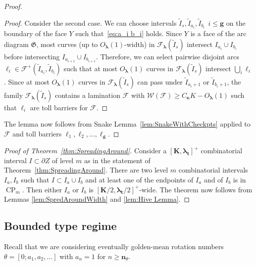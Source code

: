 \documentclass{amsart}
\renewcommand{\sp}{{\ \ }}
\newcommand{\1}{{\mathbb 1 }}
\newcommand{\blambda}{{\boldsymbol\lambda}}
\newcommand{\bkappa}{{\boldsymbol\kappa}}
\newcommand{\Fam}{{\mathcal F}}
\newcommand{\Width}{{\mathcal W}}
\newcommand{\bK}{{\mathbf K}}
\newcommand{\bbn}{{\mathbf n}}
\newcommand{\bbt}{{\mathbf t}}
\newcommand{\bbg}{{\mathbf g}}
\theoremstyle{remark}
\numberwithin{equation}{section}
\theoremstyle{definition}
\newcommand{\CP}{{\operatorname{CP}}}
\begin{document}
\begin{proof}
\begin{proof}
Consider the second case. We can choose intervals $\widetilde I_s, \widetilde I_{a_i}, \widetilde I_{b_i} \sp i\le \bbg$ on the boundary of the face $Y$ such that~\eqref{eq:a_i b_i} holds. Since $Y$ is a face of the arc diagram $\mathfrak G$, most curves (up to  $O_\blambda(1)$-width) in $\Fam_\blambda(\widetilde I_s)$ intersect $I_{a_i}\cup I_{b_i}$ before intersecting $I_{a_{i+1}}\cup I_{b_{i+1}}$. Therefore, we can select pairwise disjoint arcs $\ell_i\in \Fam^+(\widetilde I_{a_i},\widetilde I_{b_i})$ such that at most $O_\blambda(1)$ curves in $\Fam_\blambda(\widetilde I_s)$ intersect $\bigcup_i \ell_i$. Since at most $O_\blambda(1)$ curves in $\Fam_\blambda(\widetilde I_s)$ can pass under $\widetilde I_{a_{i}+1}$ or $\widetilde I_{b_{i}+1}$, the family $\Fam_\blambda(\widetilde I_s)$ contains a lamination $\Fam$ with $\Width(\Fam)\ge C_\bkappa K-O_\blambda(1)$ such that $\ell_i$ are toll barriers for $\Fam$.
\end{proof}

The lemma now follows from Snake Lemma~\ref{lem:SnakeWithCheckpts} applied to $\Fam$ and toll barriers $\ell_1, \ell_2, \dots, \ell_\bbg$.
 \end{proof}

\begin{proof}[Proof of Theorem~\ref{thm:SpreadingAround}]  Consider a $[\bK,\blambda_\bbt]^+$ combinatorial interval $I\subset \partial Z$ of level $m$ as in the statement of Theorem~\ref{thm:SpreadingAround}. There are two level $m$ combinatorial intervals $I_a,I_b$ such that $I\subset I_a\cup I_b$ and at least one of the endpoints of $I_a$ and of $I_b$ is in $\CP_m$. Then either $I_a$ or $I_b$ is $[\bK/2,\blambda_\bbt/2]^+$-wide. The theorem now follows from Lemmas \ref{lem:SpredAroundWidth} and \ref{lem:Hive Lemma}.
\end{proof}


\subsection{Bounded type regime} Recall that we are considering eventually golden-mean rotation numbers $\theta=[0;a_1,a_2,\dots]$ with $a_n=1$ for $n\ge \bbn_\theta$. 
\end{document}

